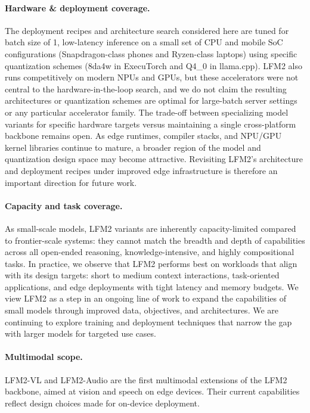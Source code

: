 \documentclass{article}
\begin{document}
\paragraph{Hardware \& deployment coverage.}

The deployment recipes and architecture search considered here are tuned for batch size of 1, low-latency inference on a small set of CPU and mobile SoC configurations (Snapdragon-class phones and Ryzen-class laptops) using specific quantization schemes (8da4w in ExecuTorch and Q4\_0 in llama.cpp). LFM2 also runs competitively on modern NPUs and GPUs, but these accelerators were not central to the hardware-in-the-loop search, and we do not claim the resulting architectures or quantization schemes are optimal for large-batch server settings or any particular accelerator family. The trade-off between specializing model variants for specific hardware targets versus maintaining a single cross-platform backbone remains open. As edge runtimes, compiler stacks, and NPU/GPU kernel libraries continue to mature, a broader region of the model and quantization design space may become attractive. Revisiting LFM2’s architecture and deployment recipes under improved edge infrastructure is therefore an important direction for future work.

\paragraph{Capacity and task coverage.} 

As small-scale models, LFM2 variants are inherently capacity-limited compared to frontier-scale systems: they cannot match the breadth and depth of capabilities across all open-ended reasoning, knowledge-intensive, and highly compositional tasks. In practice, we observe that LFM2 performs best on workloads that align with its design targets: short to medium context interactions, task-oriented applications, and edge deployments with tight latency and memory budgets. We view LFM2 as a step in an ongoing line of work to expand the capabilities of small models through improved data, objectives, and architectures. We are continuing to explore training and deployment techniques that narrow the gap with larger models for targeted use cases.


\paragraph{Multimodal scope.}
LFM2-VL and LFM2-Audio are the first multimodal extensions of the LFM2 backbone, aimed at vision and speech on edge devices. Their current capabilities reflect design choices made for on-device deployment.
\end{document}
